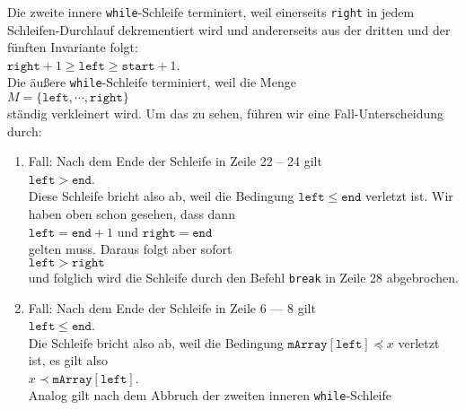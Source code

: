 Die zweite innere
\texttt{while}-Schleife terminiert, weil einerseits \texttt{right} in jedem Schleifen-Durchlauf
dekrementiert wird und andererseits aus der dritten und der f\"unften Invariante folgt: \\[0.1cm]
\hspace*{1.3cm} $\texttt{right} + 1\geq \texttt{left} \geq \mathtt{start} + 1$. \\[0.1cm]
Die \"au{\ss}ere \texttt{while}-Schleife terminiert, weil die Menge \\[0.1cm]
\hspace*{1.3cm} $M = \{ \mathtt{left}, \cdots, \mathtt{right} \}$ \\[0.1cm]
st\"andig verkleinert wird.  Um das zu sehen, f\"uhren wir eine Fall-Unterscheidung durch:
\begin{enumerate}
\item Fall: Nach dem Ende der Schleife in Zeile 22 -- 24 gilt \\[0.1cm]
      \hspace*{1.3cm} $\mathtt{left} > \mathtt{end}$. \\[0.1cm]
      Diese Schleife bricht also ab, weil die Bedingung $\mathtt{left} \leq \mathtt{end}$
      verletzt ist.  Wir haben oben schon gesehen, dass dann \\[0.1cm]
      \hspace*{1.3cm} 
      $\texttt{left} = \mathtt{end} + 1$ \quad und \quad $\mathtt{right} = \mathtt{end}$
      \\[0.1cm]
      gelten muss.  Daraus folgt aber sofort \\[0.1cm]
      \hspace*{1.3cm} $\mathtt{left} > \mathtt{right}$ \\[0.1cm]
      und folglich wird die Schleife durch den Befehl \texttt{break} in Zeile 28 abgebrochen.
\item Fall: Nach dem Ende der Schleife in Zeile 6 --- 8 gilt \\[0.1cm]
      \hspace*{1.3cm} $\mathtt{left} \leq \mathtt{end}$. \\[0.1cm]
      Die Schleife bricht also ab, weil die Bedingung 
      $\mathtt{mArray}[\mathtt{left}] \preceq x$ verletzt ist, es gilt also \\[0.1cm]
      \hspace*{1.3cm} $x \prec \mathtt{mArray}[\mathtt{left}]$. \\[0.1cm]
      Analog gilt nach dem Abbruch der zweiten inneren \texttt{while}-Schleife \\[0.1cm]

\end{enumerate}
